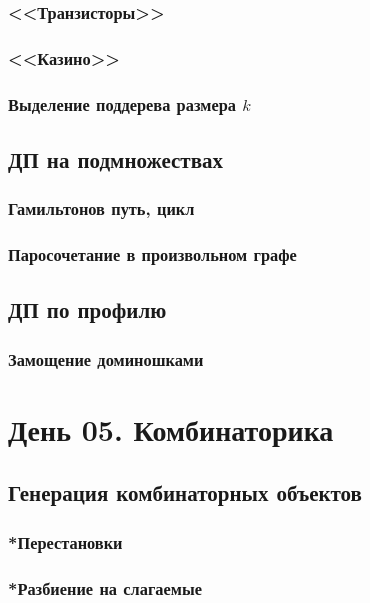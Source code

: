 \documentclass[a4paper,12pt]{article}
\begin{document}
      \subsubsection{<<Транзисторы>>}
      \subsubsection{<<Казино>>}
      \subsubsection{Выделение поддерева размера $k$}

    \subsection{ДП на подмножествах}
      \subsubsection{Гамильтонов путь, цикл}
      \subsubsection{Паросочетание в произвольном графе}

    \subsection{ДП по профилю}
      \subsubsection{Замощение доминошками}

  \newpage

  \section{День 05. Комбинаторика}

    \subsection{Генерация комбинаторных объектов}
      \subsubsection{*Перестановки}
      \subsubsection{*Разбиение на слагаемые}
\end{document}
